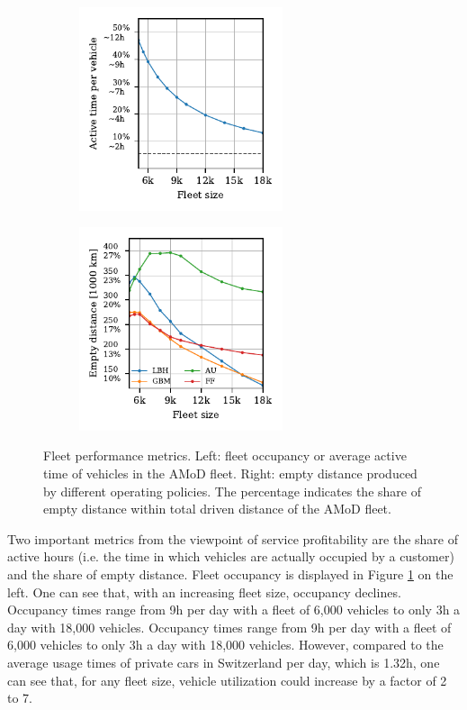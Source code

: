 \begin{figure}
\centering
\begin{subfigure}{0.5\textwidth}
  \centering
  \includegraphics[width=2.35in]{figures/revision/rev_occupancy.pdf}
\end{subfigure}%
\begin{subfigure}{0.5\textwidth}
  \centering
  \includegraphics[width=2.35in]{figures/revision/rev_empty_miles.pdf}
\end{subfigure}
\caption{Fleet performance metrics. Left: fleet occupancy or average active time of vehicles in the AMoD fleet. Right: empty distance produced by different operating policies. The percentage indicates the share of empty distance within total driven distance of the AMoD fleet.}
\label{fig:fleet_info}
\end{figure}

Two important metrics from the viewpoint of service profitability are the share of active hours (i.e. the time in which vehicles are actually occupied by a customer) and the share of empty distance.  Fleet occupancy is displayed in Figure \ref{fig:fleet_info} on the left. One can see that, with an increasing fleet size, occupancy declines. Occupancy times range from 9h per day with a fleet of 6,000 vehicles to only 3h a day with 18,000 vehicles. Occupancy times range from 9h per day with a fleet of 6,000 vehicles to only 3h a day with 18,000 vehicles. However, compared to the average usage times of private cars in Switzerland per day, which is 1.32h\citep{Bosch2016a}, one can see that, for any fleet size, vehicle utilization could increase by a factor of 2 to 7.


